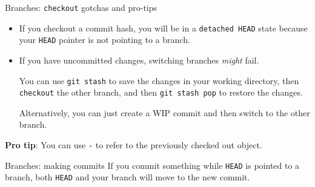 \documentclass{beeper}
\begin{document}
\begin{frame}{Branches: \texttt{checkout} gotchas and pro-tips}
    \begin{itemize}
        \item If you checkout a commit hash, you will be in a \texttt{detached
            HEAD} state because your \texttt{HEAD} pointer is not pointing to a
            branch.
            \pause

        \item If you have uncommitted changes, switching branches \textit{might}
            fail.
            \pause

            You can use \texttt{git stash} to save the changes in your working
            directory, then \texttt{checkout} the other branch, and then
            \texttt{git stash pop} to restore the changes.

            Alternatively, you can just create a WIP commit and then switch to
            the other branch.
    \end{itemize}
    \pause

    \textbf{Pro tip}: You can use \texttt{-} to refer to the previously checked
    out object.
\end{frame}

\begin{frame}{Branches: making commits}
    If you commit something while \texttt{HEAD} is pointed to a branch, both
    \texttt{HEAD} and your branch will move to the new commit.

\end{frame}
\end{document}
